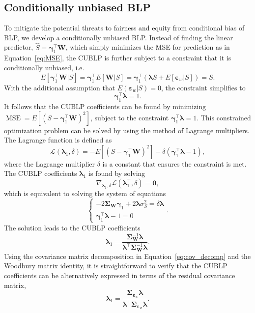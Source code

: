 \documentclass[man, floatsintext]{apa7}
\newcommand{\mbf}[1]{\bm{#1}}
\newcommand{\bgamma}{\mbf{\gamma}}
\newcommand{\blambda}{\mbf{\lambda}}
\newcommand{\bW}{\mbf{W}}
\newcommand{\bsigma}{\mbf{\Sigma}}
\DeclareMathOperator{\MSE}{MSE}
\begin{document}
  \subsection{Conditionally unbiased BLP}
  To mitigate the potential threats to fairness and equity from conditional bias
  of BLP, we develop a conditionally unbiased BLP. Instead of finding the linear
  predictor, $\hat{S} = \bgamma_1^\top \bW$, which simply minimizes the MSE for
  prediction as in Equation~\ref{eq:MSE}, the CUBLP is further subject to a
  constraint that it is conditionally unbiased, i.e.
  \begin{equation}
    E[\bgamma_1^\top\bW|S] = \bgamma_1^\top E[\bW|S] = \bgamma_1^\top (\blambda
    S + E[\mbf{\varepsilon}_w|S]) = S.
  \end{equation}
  With the additional assumption that $E(\mbf{\varepsilon}_w|S) = 0$, the
  constraint simplifies to
  \begin{equation}
  \label{eq:unbias_constraint}
    \bgamma_1^\top \blambda = 1.
  \end{equation}
  It follows that the CUBLP coefficients can be found by minimizing $\MSE = E[
  (S-\bgamma_1^\top \bW)^2]$, subject to the constraint $\bgamma_1^\top
  \blambda = 1$. This constrained optimization problem can be solved by using
  the method of Lagrange multipliers. The Lagrange function is defined as
  \begin{equation}
    \mathcal{L} (\blambda_1, \delta) = -E[(S-\bgamma_1^\top \bW)^2] - \delta
    (\bgamma_1^\top \blambda - 1),
  \end{equation}
  where the Lagrange multiplier $\delta$ is a constant that ensures the
  constraint is met. The CUBLP coefficients $\blambda_1$ is found by solving
  \begin{equation}
    \nabla_{\blambda_1, \delta} \mathcal{L}(\blambda_1^\top, \delta) = \mbf{0},
  \end{equation}
  which is equivalent to solving the system of equations
  \begin{equation}
    \begin{cases}
      -2\bsigma_{\bW} \bgamma_1 + 2\blambda\sigma_S^2 = \delta\blambda\\
      \bgamma_1^\top \blambda -1 = 0
    \end{cases}.
  \end{equation}
  The solution leads to the CUBLP coefficients
  \begin{equation}
    \blambda_1 = \frac{\bsigma_{\bW}^{-1}\blambda}{\blambda^\top \bsigma_{\bW}^
    {-1}\blambda}.
  \end{equation}
  Using the covariance matrix decomposition in Equation~\ref{eq:cov_decomp} and
  the Woodbury matrix identity, it is straightforward to verify that the CUBLP
  coefficients can be alternatively expressed in terms of the residual
  covariance matrix,
  \begin{equation}
    \blambda_1 = \frac{\bsigma_{\mbf{\varepsilon}_w}\blambda}{\blambda^\top
    \bsigma_{\mbf{\varepsilon}_w} \blambda}.
  \end{equation}
\end{document}
